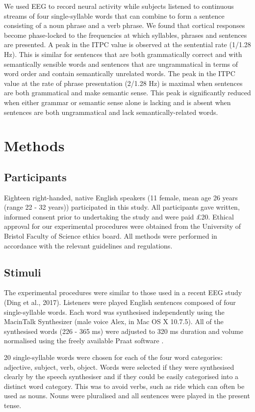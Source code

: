 \documentclass[10pt,letterpaper]{article}
\begin{document}
We used EEG to record neural activity while subjects listened to continuous streams of four single-syllable words that can combine to form a sentence consisting of a noun phrase and a verb phrase. We found that cortical responses become phase-locked to the frequencies at which syllables, phrases and
sentences are presented. A peak in the ITPC value is observed at the sentential rate (1/1.28 Hz). This is similar for sentences that are both grammatically correct and with semantically sensible words and sentences that are ungrammatical in terms of word order and contain semantically
 unrelated words. The peak in the ITPC value at the rate of phrase presentation
 (2/1.28 Hz) is maximal when sentences are both grammatical and make
 semantic sense. This peak is significantly reduced when either grammar or
 semantic sense alone is lacking and is absent when sentences are both ungrammatical and
 lack semantically-related words. 


\section*{Methods}
\subsection*{Participants}

Eighteen right-handed, native English speakers (11 female, mean age 26
years (range 22 - 32 years)) participated in this study. All
participants gave written, informed consent prior to undertaking the
study and were paid £20. Ethical approval for our experimental procedures were obtained from the University of Bristol Faculty of Science ethics board. All methods were performed in accordance with the relevant guidelines and regulations.

\subsection*{Stimuli}

The experimental procedures were similar to those used in a recent EEG
study (Ding et al., 2017). Listeners were played English sentences
composed of four single-syllable words. Each word was synthesised
independently using the MacinTalk Synthesizer (male voice Alex, in Mac
OS X 10.7.5). All of the synthesised words (226 - 365 ms) were
adjusted to 320 ms duration and volume normalised using the freely
available Praat software \cite{BoersmaWeenink2018}.

20 single-syllable words were chosen for each of the four word
categories: adjective, subject, verb, object. Words were selected if
they were synthesised clearly by the speech synthesiser and if they
could be easily categorised into a distinct word category.  This was
to avoid verbs, such as ride which can
often be used as nouns. Nouns were pluralised and all sentences were
played in the present tense.
\end{document}
